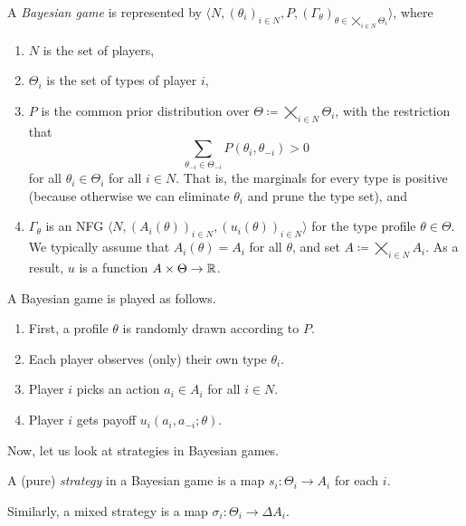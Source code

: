 	\begin{fdef}
		\label{def: bayesian game}
		A \emph{Bayesian game} is represented by $\langle N , (\theta_i)_{i \in N} , P , (\Gamma_\theta)_{\theta \in \bigtimes_{i \in N} \Theta_i} \rangle$, where
		\begin{enumerate}
			\item $N$ is the set of players,
			\item $\Theta_i$ is the set of types of player $i$,
			\item $P$ is the common prior distribution over $\Theta \coloneqq \bigtimes_{i \in N} \Theta_i$, with the restriction that
			\[ \sum_{\theta_{-i} \in \Theta_{-i}} P(\theta_i,\theta_{-i}) > 0 \]
			for all $\theta_i \in \Theta_i$ for all $i \in N$. That is, the marginals for every type is positive (because otherwise we can eliminate $\theta_i$ and prune the type set), and
			\item $\Gamma_\theta$ is an NFG $\langle N , (A_i(\theta))_{i \in N} , (u_i(\theta))_{i \in N} \rangle$ for the type profile $\theta \in \Theta$. We typically assume that $A_i (\theta) = A_i$ for all $\theta$, and set $A \coloneqq \bigtimes_{i \in N} A_i$. As a result, $u$ is a function $A \times \Theta \to \mathbb{R}$.
		\end{enumerate}
	\end{fdef}

	A Bayesian game is played as follows.
	\begin{enumerate}
		\item First, a profile $\theta$ is randomly drawn according to $P$.
		\item Each player observes (only) their own type $\theta_i$.
		\item Player $i$ picks an action $a_i \in A_i$ for all $i \in N$.
		\item Player $i$ gets payoff $u_i(a_i,a_{-i};\theta)$.
	\end{enumerate}

	Now, let us look at strategies in Bayesian games.

	\begin{fdef}
		A (pure) \emph{strategy} in a Bayesian game is a map $s_i : \Theta_i \to A_i$ for each $i$.
	\end{fdef}

	Similarly, a mixed strategy is a map $\sigma_i : \Theta_i \to \Delta A_i$.

